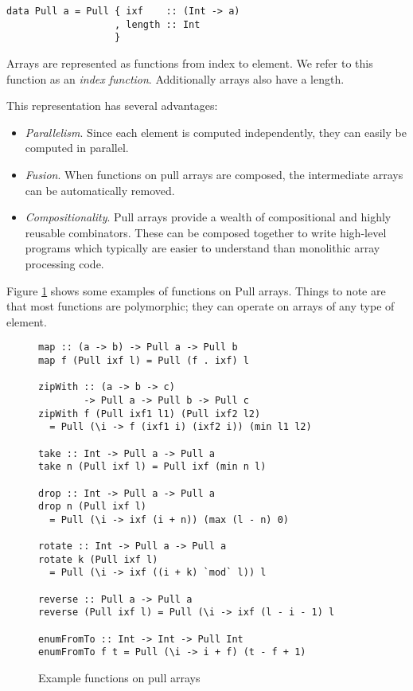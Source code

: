 \documentclass[preprint]{sigplanconf}
\begin{document}
\begin{small}
\begin{Verbatim}
data Pull a = Pull { ixf    :: (Int -> a)
                   , length :: Int
                   }
\end{Verbatim}
\end{small}

Arrays are represented as functions from index to element. We refer to
this function as an \emph{index function}. Additionally arrays also
have a length.

This representation has several advantages:
\begin{itemize}
\item \emph{Parallelism}. Since each element is computed
  independently, they can easily be computed in parallel.
\item \emph{Fusion}. When functions on pull arrays are composed, the intermediate
  arrays can be automatically removed. 
\item \emph{Compositionality}. Pull arrays provide a wealth of
  compositional and highly reusable combinators. These can be composed
  together to write high-level programs which typically are easier to
  understand than monolithic array processing code.
\end{itemize}

Figure \ref{fig:pullex} shows some examples of functions on Pull
arrays. Things to note are that most functions are polymorphic; they
can operate on arrays of any type of element.

\begin{figure}
\begin{small}
\begin{Verbatim}
map :: (a -> b) -> Pull a -> Pull b
map f (Pull ixf l) = Pull (f . ixf) l

zipWith :: (a -> b -> c)
        -> Pull a -> Pull b -> Pull c
zipWith f (Pull ixf1 l1) (Pull ixf2 l2)
  = Pull (\i -> f (ixf1 i) (ixf2 i)) (min l1 l2)

take :: Int -> Pull a -> Pull a
take n (Pull ixf l) = Pull ixf (min n l)

drop :: Int -> Pull a -> Pull a
drop n (Pull ixf l)
  = Pull (\i -> ixf (i + n)) (max (l - n) 0)

rotate :: Int -> Pull a -> Pull a
rotate k (Pull ixf l)
  = Pull (\i -> ixf ((i + k) `mod` l)) l

reverse :: Pull a -> Pull a
reverse (Pull ixf l) = Pull (\i -> ixf (l - i - 1) l

enumFromTo :: Int -> Int -> Pull Int
enumFromTo f t = Pull (\i -> i + f) (t - f + 1)
\end{Verbatim}
\end{small}
\caption{Example functions on pull arrays}
\label{fig:pullex}
\end{figure}
\end{document}
